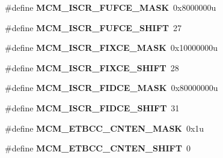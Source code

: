 \begin{DoxyCompactItemize}
\item 
\#define {\bfseries M\+C\+M\+\_\+\+I\+S\+C\+R\+\_\+\+F\+U\+F\+C\+E\+\_\+\+M\+A\+SK}~0x8000000u\hypertarget{group__MCM__Register__Masks_ga9fa9ddc6391e5958245ccd332ebcd575}{}\label{group__MCM__Register__Masks_ga9fa9ddc6391e5958245ccd332ebcd575}

\item 
\#define {\bfseries M\+C\+M\+\_\+\+I\+S\+C\+R\+\_\+\+F\+U\+F\+C\+E\+\_\+\+S\+H\+I\+FT}~27\hypertarget{group__MCM__Register__Masks_gaeeab14ab4de1fa7d2d9a5d2492730e74}{}\label{group__MCM__Register__Masks_gaeeab14ab4de1fa7d2d9a5d2492730e74}

\item 
\#define {\bfseries M\+C\+M\+\_\+\+I\+S\+C\+R\+\_\+\+F\+I\+X\+C\+E\+\_\+\+M\+A\+SK}~0x10000000u\hypertarget{group__MCM__Register__Masks_gad92657cd1980c03f0d15615a3c9f2989}{}\label{group__MCM__Register__Masks_gad92657cd1980c03f0d15615a3c9f2989}

\item 
\#define {\bfseries M\+C\+M\+\_\+\+I\+S\+C\+R\+\_\+\+F\+I\+X\+C\+E\+\_\+\+S\+H\+I\+FT}~28\hypertarget{group__MCM__Register__Masks_gab9757207c9768c3f13461873bcb78d71}{}\label{group__MCM__Register__Masks_gab9757207c9768c3f13461873bcb78d71}

\item 
\#define {\bfseries M\+C\+M\+\_\+\+I\+S\+C\+R\+\_\+\+F\+I\+D\+C\+E\+\_\+\+M\+A\+SK}~0x80000000u\hypertarget{group__MCM__Register__Masks_ga0dc0741a93b687a65f28c5a1e109ba6e}{}\label{group__MCM__Register__Masks_ga0dc0741a93b687a65f28c5a1e109ba6e}

\item 
\#define {\bfseries M\+C\+M\+\_\+\+I\+S\+C\+R\+\_\+\+F\+I\+D\+C\+E\+\_\+\+S\+H\+I\+FT}~31\hypertarget{group__MCM__Register__Masks_ga19c565ce09db7c0d22bf65f93d9aabfc}{}\label{group__MCM__Register__Masks_ga19c565ce09db7c0d22bf65f93d9aabfc}

\item 
\#define {\bfseries M\+C\+M\+\_\+\+E\+T\+B\+C\+C\+\_\+\+C\+N\+T\+E\+N\+\_\+\+M\+A\+SK}~0x1u\hypertarget{group__MCM__Register__Masks_gaaffa6b23f821bd7647db6b0abcaf504a}{}\label{group__MCM__Register__Masks_gaaffa6b23f821bd7647db6b0abcaf504a}

\item 
\#define {\bfseries M\+C\+M\+\_\+\+E\+T\+B\+C\+C\+\_\+\+C\+N\+T\+E\+N\+\_\+\+S\+H\+I\+FT}~0\hypertarget{group__MCM__Register__Masks_ga8262666b7fec7b20ea3e871bdb325dc1}{}\label{group__MCM__Register__Masks_ga8262666b7fec7b20ea3e871bdb325dc1}


\end{DoxyCompactItemize}
